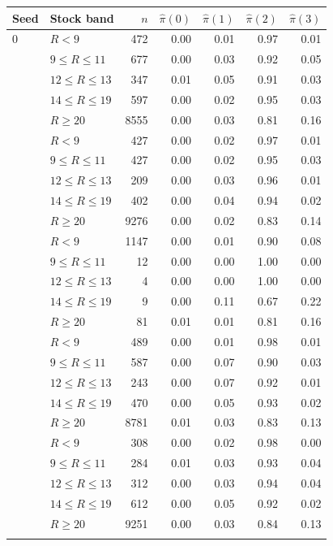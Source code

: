 \begin{tabular}{llrrrrr}
\toprule
Seed & Stock band & $n$ & $\hat\pi(0)$ & $\hat\pi(1)$ & $\hat\pi(2)$ & $\hat\pi(3)$ \\
\midrule
0 & $R<9$ & 472 & 0.00 & 0.01 & 0.97 & 0.01 \\
 & $9\le R\le 11$ & 677 & 0.00 & 0.03 & 0.92 & 0.05 \\
 & $12\le R\le 13$ & 347 & 0.01 & 0.05 & 0.91 & 0.03 \\
 & $14\le R\le 19$ & 597 & 0.00 & 0.02 & 0.95 & 0.03 \\
 & $R\ge 20$ & 8555 & 0.00 & 0.03 & 0.81 & 0.16 \\
\addlinespace
1 & $R<9$ & 427 & 0.00 & 0.02 & 0.97 & 0.01 \\
 & $9\le R\le 11$ & 427 & 0.00 & 0.02 & 0.95 & 0.03 \\
 & $12\le R\le 13$ & 209 & 0.00 & 0.03 & 0.96 & 0.01 \\
 & $14\le R\le 19$ & 402 & 0.00 & 0.04 & 0.94 & 0.02 \\
 & $R\ge 20$ & 9276 & 0.00 & 0.02 & 0.83 & 0.14 \\
\addlinespace
2 & $R<9$ & 1147 & 0.00 & 0.01 & 0.90 & 0.08 \\
 & $9\le R\le 11$ & 12 & 0.00 & 0.00 & 1.00 & 0.00 \\
 & $12\le R\le 13$ & 4 & 0.00 & 0.00 & 1.00 & 0.00 \\
 & $14\le R\le 19$ & 9 & 0.00 & 0.11 & 0.67 & 0.22 \\
 & $R\ge 20$ & 81 & 0.01 & 0.01 & 0.81 & 0.16 \\
\addlinespace
3 & $R<9$ & 489 & 0.00 & 0.01 & 0.98 & 0.01 \\
 & $9\le R\le 11$ & 587 & 0.00 & 0.07 & 0.90 & 0.03 \\
 & $12\le R\le 13$ & 243 & 0.00 & 0.07 & 0.92 & 0.01 \\
 & $14\le R\le 19$ & 470 & 0.00 & 0.05 & 0.93 & 0.02 \\
 & $R\ge 20$ & 8781 & 0.01 & 0.03 & 0.83 & 0.13 \\
\addlinespace
4 & $R<9$ & 308 & 0.00 & 0.02 & 0.98 & 0.00 \\
 & $9\le R\le 11$ & 284 & 0.01 & 0.03 & 0.93 & 0.04 \\
 & $12\le R\le 13$ & 312 & 0.00 & 0.03 & 0.94 & 0.04 \\
 & $14\le R\le 19$ & 612 & 0.00 & 0.05 & 0.92 & 0.02 \\
 & $R\ge 20$ & 9251 & 0.00 & 0.03 & 0.84 & 0.13 \\
\addlinespace
\bottomrule
\end{tabular}
